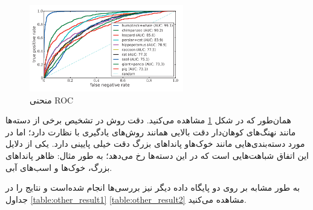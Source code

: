 \begin{figure}[h]
	\centering
	\includegraphics[width=0.6\textwidth]{img/report/ROC}
	\caption{منحنی ROC \cite{Lampert2014}}
	\label{fig:ROC}
	\centering
\end{figure}
همان‌طور که در شکل 
\ref{fig:ROC}
مشاهده می‌کنید. دقت روش در تشخیص برخی از دسته‌ها مانند نهنگ‌های کوهان‌دار دقت بالایی همانند روش‌های یادگیری با نظارت دارد؛ اما در مورد دسته‌بندی‌هایی مانند خوک‌هاو پاندا‌های بزرگ دقت خیلی پایینی دارد. یکی از دلایل این اتفاق شباهت‌هایی است که در این دسته‌ها رخ می‌دهد؛ به طور مثال: ظاهر پاندا‌های بزرگ، خوک‌ها و اسب‌های آبی.

به طور مشابه بر روی دو پایگاه داده دیگر نیز بررسی‌ها انجام شده‌است و نتایج را در جداول 
\ref{table:other_result1}
\ref{table:other_result2}
مشاهده می‌کنید.

